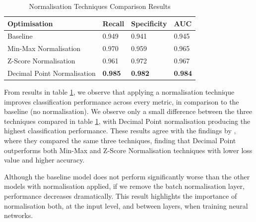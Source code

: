             
        \begin{table}[H]
            \centering
            \caption{Normalisation Techniques Comparison Results} \vspace{0.5cm}
            \label{5: german_accuracy_scores_normalisation }
                \begin{tabular}{|p{6.5cm}|p{2.5cm}|p{2.5cm}|p{2.5cm}|}
                    \hline \textbf{Optimisation} & \textbf{Recall} & \textbf{Specificity} & \textbf{AUC} \\ \hline \hline
                    Baseline & 0.949 & 0.941 & 0.945 \\ \hline
                    Min-Max Normalisation  & 0.970 & 0.959 & 0.965 \\ \hline
                    Z-Score Normalisation  & 0.961 & 0.972 & 0.967 \\ \hline
                    Decimal Point Normalisation  & \textbf{0.985} & \textbf{0.982}  & \textbf{0.984} \\ \hline
                \end{tabular}
        \end{table}

        

        
        From results in table \ref{5: german_accuracy_scores_normalisation }, we observe that applying a normalisation technique improves classification performance across every metric, in comparison to the baseline (no normalisation). We observe only a small difference between the three techniques compared in table \ref{5: german_accuracy_scores_normalisation }, with Decimal Point normalisation producing the highest classification performance. These results agree with the findings by \cite{normalisation_comparison}, where they compared the same three techniques, finding that Decimal Point outperforms both Min-Max and Z-Score Normalisation techniques with lower loss value and higher accuracy.
        
        Although the baseline model does not perform significantly worse than the other models with normalisation applied, if we remove the batch normalisation layer, performance decreases dramatically. This result highlights the importance of normalisation both, at the input level, and between layers, when training neural networks.  
        
